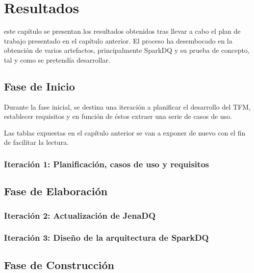 \chapter{Resultados}
\label{chap:resultados}

 este capítulo se presentan los resultados obtenidos tras llevar a
cabo el plan de trabajo presentado en el capítulo anterior. El proceso ha
desembocado en la obtención de varios artefactos, principalmente SparkDQ y su
prueba de concepto, tal y como se pretendía desarrollar. 

\section{Fase de Inicio}

Durante la fase inicial, se destina una iteración a planificar el desarrollo del
\acs{TFM}, establecer requisitos y en función de éstos extraer una serie de
casos de uso.

Las tablas expuestas en el capítulo anterior se van a exponer de nuevo con el
fin de facilitar la lectura.

\subsection{Iteración 1: Planificación, casos de uso y requisitos}



\section{Fase de Elaboración}

\subsection{Iteración 2: Actualización de JenaDQ}



\subsection{Iteración 3: Diseño de la arquitectura de SparkDQ}



\section{Fase de Construcción}

